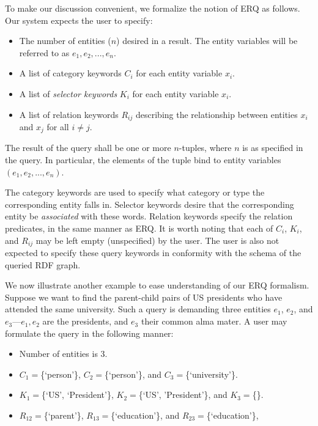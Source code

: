 \documentclass[a4paper, twoside, 12pt]{report}
\begin{document}
To make our discussion convenient, we formalize the notion of ERQ as follows. Our system expects the user to specify:

\begin{itemize}
\item The number of entities ($n$) desired in a result. The entity variables will be referred to as $e_1, e_2, ..., e_n$.
\item A list of category keywords $C_i$ for each entity variable $x_i$.
\item A list of \emph{selector keywords} $K_i$ for each entity variable $x_i$.
\item A list of relation keywords $R_{ij}$ describing the relationship between entities $x_i$ and $x_j$ for all $i \neq j$.
\end{itemize}

The result of the query shall be one or more $n$-tuples, where $n$ is as specified in the query. In particular, the elements of the tuple bind to entity variables $(e_1, e_2, ..., e_n)$.

The category keywords are used to specify what category or type the corresponding entity falls in. Selector keywords desire that the corresponding entity be \emph{associated} with these words. Relation keywords specify the relation predicates, in the same manner as ERQ. It is worth noting that each of $C_i$, $K_i$, and $R_{ij}$ may be left empty (unspecified) by the user. The user is also not expected to specify these query keywords in conformity with the schema of the queried RDF graph.

We now illustrate another example to ease understanding of our ERQ formalism. Suppose we want to find the parent-child pairs of US presidents who have attended the same university. Such a query is demanding three entities $e_1$, $e_2$, and $e_3$---$e_1, e_2$ are the presidents, and $e_3$ their common alma mater. A user may formulate the query in the following manner:

\begin{itemize}
\item Number of entities is 3.
\item $C_1=$\{`person'\}, $C_2=$\{`person'\}, and $C_3=$\{`university'\}.
\item $K_1=$\{`US', `President'\}, $K_2=$\{`US', 'President'\}, and $K_3=$\{\}.
\item $R_{12}=$\{`parent'\}, $R_{13}=$\{`education'\}, and $R_{23}=$\{`education'\},
\end{itemize}
\end{document}
